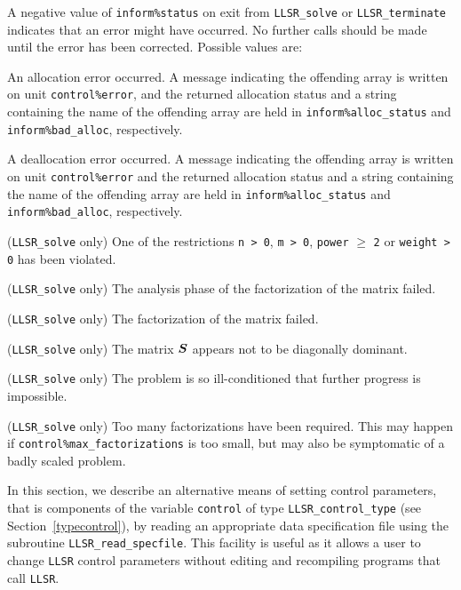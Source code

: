 \documentclass{galahad}
\newcommand{\packagename}{LLSR}
\begin{document}

\galerrors
A negative value of  {\tt inform\%status} on exit from
{\tt \packagename\_solve}
or
{\tt \packagename\_terminate}
indicates that an error might have occurred. No further calls should be made
until the error has been corrected. Possible values are:

\begin{description}
 An allocation error occurred. A message indicating
the offending
array is written on unit {\tt control\%error}, and the returned allocation
status and a string containing the name of the offending array
are held in {\tt inform\%alloc\_\-status}
and {\tt inform\%bad\_alloc}, respectively.

 A deallocation error occurred.
A message indicating the offending
array is written on unit {\tt control\%error} and the returned allocation
status and a string containing the name of the offending array
are held in {\tt inform\%alloc\_\-status}
and {\tt inform\%bad\_alloc}, respectively.

 ({\tt \packagename\_solve} only)
One of the restrictions
{\tt n > 0},
{\tt m > 0},
{\tt power} $\geq$ {\tt 2}
or
{\tt weight > 0}
has been violated.

 ({\tt \packagename\_solve} only)
The analysis phase of the factorization of the matrix  failed.

 ({\tt \packagename\_solve} only)
The factorization of the matrix  failed.

 ({\tt \packagename\_solve} only)
The matrix ${\bm{S}}$ appears not to be diagonally dominant.

 ({\tt \packagename\_solve} only)
The problem is so ill-conditioned that further progress is impossible.

 ({\tt \packagename\_solve} only)
 Too many factorizations have been required.  This may happen if
    {\tt control\%max\_factorizations} is too small,
    but may also be symptomatic of a badly scaled problem.

\end{description}


\galfeatures
\noindent In this section, we describe an alternative means of setting
control parameters, that is components of the variable {\tt control} of type
{\tt \packagename\_control\_type}
(see Section~\ref{typecontrol}),
by reading an appropriate data specification file using the
subroutine {\tt \packagename\_read\_specfile}. This facility
is useful as it allows a user to change  {\tt \packagename} control parameters
without editing and recompiling programs that call {\tt \packagename}.
\end{document}
